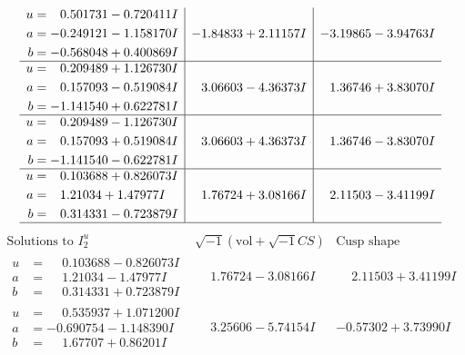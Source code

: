 \documentclass[1p]{elsarticle_modified}
\theoremstyle{definition}
\newcommand{\I}{\sqrt{-1}}
\begin{document}
$$\begin{array}{c|c|c}
\begin{aligned}
u &= \phantom{-}0.501731 - 0.720411 I \\
a &= -0.249121 - 1.158170 I \\
b &= -0.568048 + 0.400869 I\end{aligned}
 & -1.84833 + 2.11157 I & -3.19865 - 3.94763 I \\ \hline\begin{aligned}
u &= \phantom{-}0.209489 + 1.126730 I \\
a &= \phantom{-}0.157093 - 0.519084 I \\
b &= -1.141540 + 0.622781 I\end{aligned}
 & \phantom{-}3.06603 - 4.36373 I & \phantom{-}1.36746 + 3.83070 I \\ \hline\begin{aligned}
u &= \phantom{-}0.209489 - 1.126730 I \\
a &= \phantom{-}0.157093 + 0.519084 I \\
b &= -1.141540 - 0.622781 I\end{aligned}
 & \phantom{-}3.06603 + 4.36373 I & \phantom{-}1.36746 - 3.83070 I \\ \hline\begin{aligned}
u &= \phantom{-}0.103688 + 0.826073 I \\
a &= \phantom{-}1.21034 + 1.47977 I \\
b &= \phantom{-}0.314331 - 0.723879 I\end{aligned}
 & \phantom{-}1.76724 + 3.08166 I & \phantom{-}2.11503 - 3.41199 I\\
 \hline 
 \end{array}$$\newpage$$\begin{array}{c|c|c}  
\text{Solutions to }I^u_{2}& \I (\text{vol} + \sqrt{-1}CS) & \text{Cusp shape}\\
 \hline 
\begin{aligned}
u &= \phantom{-}0.103688 - 0.826073 I \\
a &= \phantom{-}1.21034 - 1.47977 I \\
b &= \phantom{-}0.314331 + 0.723879 I\end{aligned}
 & \phantom{-}1.76724 - 3.08166 I & \phantom{-}2.11503 + 3.41199 I \\ \hline\begin{aligned}
u &= \phantom{-}0.535937 + 1.071200 I \\
a &= -0.690754 - 1.148390 I \\
b &= \phantom{-}1.67707 + 0.86201 I\end{aligned}
 & \phantom{-}3.25606 - 5.74154 I & -0.57302 + 3.73990 I \\ \hline\begin{aligned}

\end{aligned}
\end{array}$$
\end{document}
